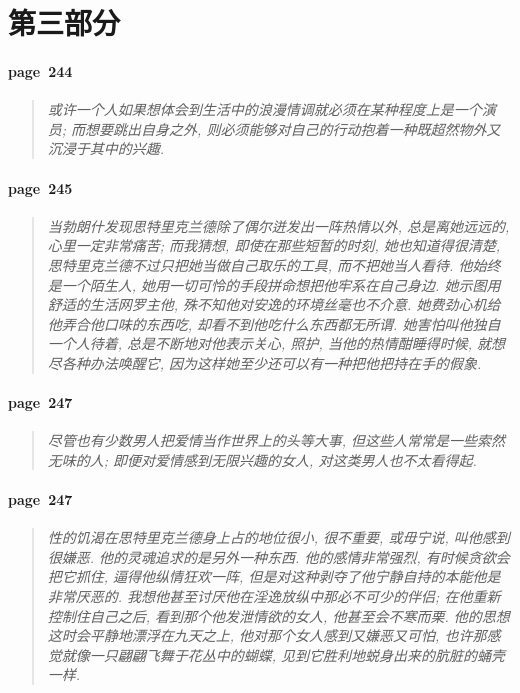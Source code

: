 \section{第三部分}

\paragraph*{page~244}
\begin{quotation}
    \itshape
    或许一个人如果想体会到生活中的浪漫情调就必须在某种程度上是一个演员; 而想要跳出自身之外, 则必须能够对自己的行动抱着一种既超然物外又沉浸于其中的兴趣. 
\end{quotation}

\paragraph*{page~245}
\begin{quotation}
    \itshape
    当勃朗什发现思特里克兰德除了偶尔迸发出一阵热情以外, 总是离她远远的, 心里一定非常痛苦; 而我猜想, 即使在那些短暂的时刻, 她也知道得很清楚, 思特里克兰德不过只把她当做自己取乐的工具, 而不把她当人看待. 他始终是一个陌生人, 她用一切可怜的手段拼命想把他牢系在自己身边. 她示图用舒适的生活网罗主他, 殊不知他对安逸的环境丝毫也不介意. 她费劲心机给他弄合他口味的东西吃, 却看不到他吃什么东西都无所谓. 她害怕叫他独自一个人待着, 总是不断地对他表示关心, 照护, 当他的热情酣睡得时候, 就想尽各种办法唤醒它, 因为这样她至少还可以有一种把他把持在手的假象. 
\end{quotation}

\paragraph*{page~247}
\begin{quotation}
    \itshape
    尽管也有少数男人把爱情当作世界上的头等大事, 但这些人常常是一些索然无味的人; 即便对爱情感到无限兴趣的女人, 对这类男人也不太看得起. 
\end{quotation}

\paragraph*{page~247}
\begin{quotation}
    \itshape
    性的饥渴在思特里克兰德身上占的地位很小, 很不重要, 或毋宁说, 叫他感到很嫌恶. 他的灵魂追求的是另外一种东西. 他的感情非常强烈, 有时候贪欲会把它抓住, 逼得他纵情狂欢一阵, 但是对这种剥夺了他宁静自持的本能他是非常厌恶的. 我想他甚至讨厌他在淫逸放纵中那必不可少的伴侣; 在他重新控制住自己之后, 看到那个他发泄情欲的女人, 他甚至会不寒而栗. 他的思想这时会平静地漂浮在九天之上, 他对那个女人感到又嫌恶又可怕, 也许那感觉就像一只翩翩飞舞于花丛中的蝴蝶, 见到它胜利地蜕身出来的肮脏的蛹壳一样. 
\end{quotation}

